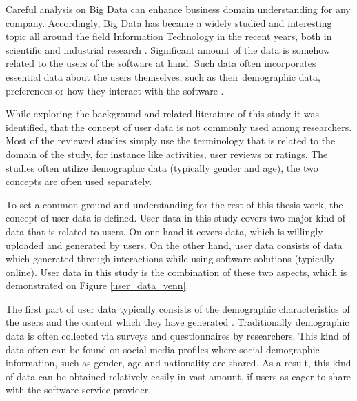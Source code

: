 Careful analysis on Big Data can enhance business domain understanding for any company. Accordingly, Big Data has became a widely studied and interesting topic all around the field Information Technology in the recent years, both in scientific and industrial research \cite{inmon2007tapping, introtodatamining}. Significant amount of the data is somehow related to the users of the software at hand. Such data often incorporates essential data about the users themselves, such as their demographic data, preferences or how they interact with the software 
\cite{jang2015noreciprocity, hu2014we, jang2016teensengagemorewithfewerphotos, han2016teensarefrommars, socialdiversityongithub}.


While exploring the background and related literature of this study it was identified, that the concept of user data is not commonly used among researchers. Most of the reviewed studies simply use the terminology that is related to the domain of the study, for instance like activities, user reviews or ratings. The studies often utilize demographic data (typically gender and age), the two concepts are often used separately. 

To set a common ground and understanding for the rest of this thesis work, the concept of user data is defined. User data in this study covers two major kind of data that is related to users. On one hand it covers data, which is willingly uploaded and generated by users. On the other hand, user data consists of data which generated through interactions while using software solutions (typically online). User data in this study is the combination of these two aspects, which is demonstrated on Figure \ref{user_data_venn}.

The first part of user data typically consists of the demographic characteristics of the users and the content which they have generated \cite{han2016teensarefrommars}. Traditionally demographic data is often collected via surveys and questionnaires by researchers. This kind of data often can be found on social media profiles where social demographic information, such as gender, age and nationality are shared. As a result, this kind of data can be obtained relatively easily in vast amount, if users as eager to share with the software service provider.

